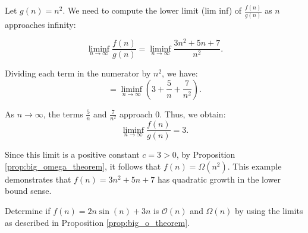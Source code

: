             \begin{solution}
            Let \( g(n) = n^2 \). We need to compute the lower limit (lim inf) of \( \frac{f(n)}{g(n)} \) as \( n \) approaches infinity:
            
            \[
            \liminf_{n \to \infty} \frac{f(n)}{g(n)} = \liminf_{n \to \infty} \frac{3n^2 + 5n + 7}{n^2}.
            \]
            
            Dividing each term in the numerator by \( n^2 \), we have:
            \[
            = \liminf_{n \to \infty} \left( 3 + \frac{5}{n} + \frac{7}{n^2} \right).
            \]
            
            As \( n \to \infty \), the terms \( \frac{5}{n} \) and \( \frac{7}{n^2} \) approach \( 0 \). Thus, we obtain:
            \[
            \liminf_{n \to \infty} \frac{f(n)}{g(n)} = 3.
            \]
            
            Since this limit is a positive constant \( c = 3 > 0 \), by Proposition \ref{prop:big_omega_theorem}, it follows that \( f(n) = \Omega(n^2) \). This example demonstrates that \( f(n) = 3n^2 + 5n + 7 \) has quadratic growth in the lower bound sense. \end{solution}

            \begin{example}
                Determine if \( f(n) = 2n \sin(n) + 3n \) is \( \mathcal{O}(n) \) and \( \Omega(n) \) by using the limits as described in Proposition \ref{prop:big_o_theorem}. \end{example}
                
